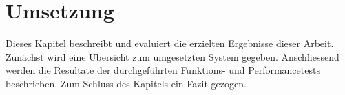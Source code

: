 \section{Umsetzung}

Dieses Kapitel beschreibt und evaluiert die erzielten Ergebnisse dieser Arbeit.
Zunächst wird eine Übersicht zum umgesetzten System gegeben.
Anschliessend werden die Resultate der durchgeführten Funktions- und Performancetests beschrieben.
Zum Schluss des Kapitels ein Fazit gezogen.





\clearpage
